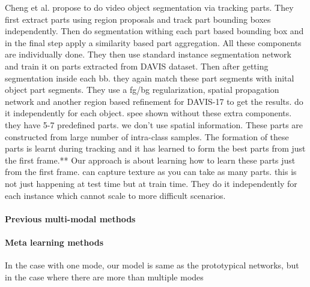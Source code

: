 \documentclass[10pt,twocolumn,letterpaper]{article}
\begin{document}
Cheng et al. \cite{Cheng_2018_CVPR} propose to do video object segmentation via tracking parts. They first extract parts using region proposals and track part bounding boxes independently. Then do segmentation withing each part based bounding box and in the final step apply a similarity based part aggregation.
All these components are individually done.
They then use standard instance segmentation network and train it on parts extracted from DAVIS dataset. Then after getting segmentation inside each bb. they again match these part segments with inital object part segments.
They use a fg/bg regularization, spatial propagation network and another region based refinement for DAVIS-17 to get the results. do it independently for each object.
spee shown without these extra components.
they have 5-7 predefined parts. we don't use spatial information. These parts are constructed from large number of intra-class samples.
The formation of these parts is learnt during tracking and it has learned to form the best parts from just the first frame.** Our approach is about learning how to learn these parts just from the first frame.
can capture texture as you can take as many parts.
this is not just happening at test time but at train time.
They do it independently for each instance which cannot scale to more difficult scenarios.

\paragraph{Previous multi-modal methods}\paragraph{Meta learning methods}
In the case with one mode, our model is same as the prototypical networks, but in the case where there are more than multiple modes
\end{document}
